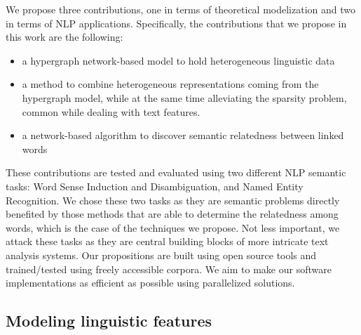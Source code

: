 We propose three contributions, one in terms of theoretical modelization and two in terms of NLP applications. Specifically, the contributions that we propose in this work are the following:
\begin{itemize}
\item a hypergraph network-based model to hold heterogeneous linguistic data %
\item a method to combine heterogeneous representations coming from the hypergraph model, while at the same time alleviating the sparsity problem, common while dealing with text features.
\item a network-based algorithm to discover semantic relatedness between linked words

\end{itemize}
These contributions are tested and evaluated using two different NLP semantic tasks: Word Sense Induction and Disambiguation, and Named Entity Recognition. We chose these two tasks as they are semantic problems directly benefited by those methods  that are able to determine the relatedness among words, which is the case of the techniques we propose. Not less important, we attack these tasks as they are central building blocks of more intricate text analysis systems. Our propositions are built using open source tools and trained/tested using freely accessible corpora. We aim to make our software implementations as efficient as possible using parallelized solutions.


\subsection{Modeling linguistic features}

